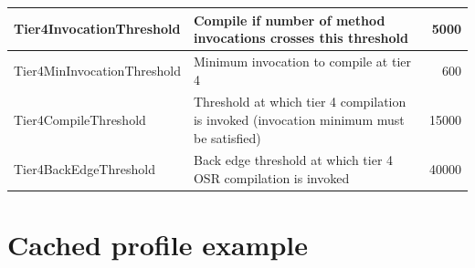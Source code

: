\begin{table}[h]
\begin{center}
\begin{tabular}{| l | p{9.0cm} | r | }
       Tier4InvocationThreshold & Compile if number of method invocations crosses this threshold & 5000 \\ \hline
       Tier4MinInvocationThreshold & Minimum invocation to compile at tier 4 & 600 \\ \hline
       Tier4CompileThreshold & Threshold at which tier 4 compilation is invoked (invocation minimum must be satisfied) & 15000 \\ \hline
       Tier4BackEdgeThreshold & Back edge threshold at which tier 4 OSR compilation is invoked & 40000 \\ \hline
    \end{tabular}
  \end{center}
\end{table}
\newpage
\section{Cached profile example}
\label{a:cacheprofileexample}
